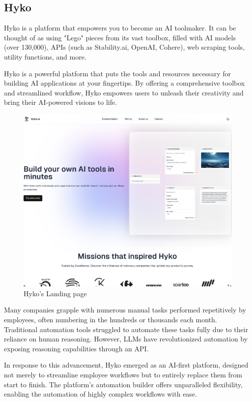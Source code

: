 \subsection{Hyko}

Hyko is a platform that empowers you to become an AI toolmaker. It can be thought of as using "Lego" pieces from its vast toolbox, filled with AI models (over 130,000), APIs (such as Stability.ai, OpenAI, Cohere), web scraping tools, utility functions, and more.

Hyko is a powerful platform that puts the tools and resources necessary for building AI applications at your fingertips. By offering a comprehensive toolbox and streamlined workflow, Hyko empowers users to unleash their creativity and bring their AI-powered visions to life.

\begin{figure}[!ht]
    \centering
    \includegraphics[width=\linewidth]{hyko.png}
    \caption{Hyko's Landing page}
    \label{fig:hyko_landing_page}
\end{figure}

Many companies grapple with numerous manual tasks performed repetitively by employees, often numbering in the hundreds or thousands each month. Traditional automation tools struggled to automate these tasks fully due to their reliance on human reasoning. However, LLMs have revolutionized automation by exposing reasoning capabilities through an API.

In response to this advancement, Hyko emerged as an AI-first platform, designed not merely to streamline employee workflows but to entirely replace them from start to finish. The platform's automation builder offers unparalleled flexibility, enabling the automation of highly complex workflows with ease.

